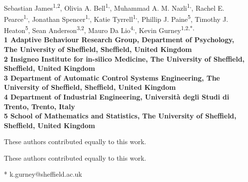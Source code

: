 \documentclass[10pt,letterpaper]{article}
\date{}
\begin{document}
\vspace*{0.35in}

\begin{flushleft}
{\Large
\textbf{}
}
\newline
\\
Sebastian James\textsuperscript{1,2},
Olivia A. Bell\textsuperscript{1,\Yinyang},
Muhammad A. M. Nazli\textsuperscript{1,\Yinyang},
Rachel E. Pearce\textsuperscript{1,\Yinyang},
Jonathan Spencer\textsuperscript{1,\Yinyang},
Katie Tyrrell\textsuperscript{1,\Yinyang},
Phillip J. Paine\textsuperscript{5},
Timothy J. Heaton\textsuperscript{5},
Sean Anderson\textsuperscript{3,2},
Mauro Da Lio\textsuperscript{4,\ddag},
Kevin Gurney\textsuperscript{1,2,*,\ddag}
\\
\bigskip
\bf{1} Adaptive Behaviour Research Group, Department of Psychology, The University of Sheffield, Sheffield, United Kingdom
\\
\bf{2} Insigneo Institute for in-silico Medicine, The University of Sheffield, Sheffield, United Kingdom
\\
\bf{3} Department of Automatic Control Systems Engineering, The University of Sheffield, Sheffield, United Kingdom
\\
\bf{4} Department of Industrial Engineering, Universit\`{a} degli Studi di Trento, Trento, Italy
\\
\bf{5} School of Mathematics and Statistics, The University of Sheffield, Sheffield, United Kingdom
\\\bigskip

%
%
\Yinyang These authors contributed equally to this work.

\ddag These authors contributed equally to this work.



* k.gurney@sheffield.ac.uk

\end{flushleft}
\end{document}
